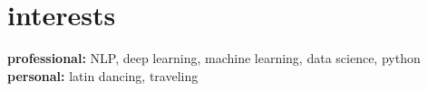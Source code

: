 \documentclass[hidelinks]{cv-style}          %
\begin{document}







\section{interests}

\textbf{professional:} NLP, deep learning, machine learning, data science, python \\
\textbf{personal:} latin dancing, traveling 









\end{document}
